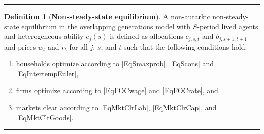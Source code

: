 \documentclass[letterpaper,12pt]{article}
\theoremstyle{definition}
\newtheorem{definition}{Definition} %
\begin{document}
    \hrule
    \begin{definition}[\textbf{Non-steady-state equilibrium}]\label{DefEquilNonSS}
      A non-autarkic non-steady-state equilibrium in the overlapping generations model with $S$-period lived agents and heterogeneous ability $e_j(s)$ is defined as allocations $c_{j,s,t}$ and $b_{j,s+1,t+1}$ and prices $w_t$ and $r_t$ for all $j$, $s$, and $t$ such that the following conditions hold:
       \begin{enumerate}
          \item households optimize according to \eqref{EqSmaxprob}, \eqref{EqScons} and \eqref{EqIntertempEuler},
          \item firms optimize according to \eqref{EqFOCwage} and \eqref{EqFOCrate}, and
          \item markets clear according to \eqref{EqMktClrLab}, \eqref{EqMktClrCap}, and \eqref{EqMktClrGoods}.
       \end{enumerate}
    \end{definition}
    \hrule
\end{document}
